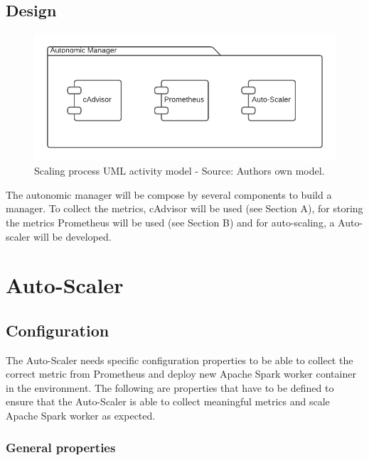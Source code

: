 \subsection{Design}

\begin{figure}[h]%
\centering
\includegraphics[scale=0.6]{images/04_conceptual_design/autonomic_manager/design}%
\caption{Scaling process UML activity model - Source: Authors own model.}%
\label{fig:am-design-component}%
\end{figure}

The autonomic manager will be compose by several components to build a manager. To collect the metrics, cAdvisor will be used (see Section A), for storing the metrics Prometheus will be used (see Section B) and for auto-scaling, a Auto-scaler will be developed.


\section{Auto-Scaler}

\subsection{Configuration}
The Auto-Scaler needs specific configuration properties to be able to collect the correct metric from Prometheus and deploy new Apache Spark worker container in the environment. The following are properties that have to be defined to ensure that the Auto-Scaler is able to collect meaningful metrics and scale Apache Spark worker as expected.

\subsubsection{General properties}

